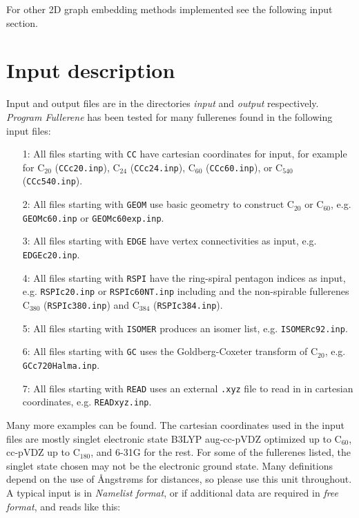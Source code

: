 \documentclass[article,a4paper,twoside]{memoir}
\newcommand{\C}[1]{\ensuremath{\mathrm{C}_{#1}}}
\newcommand{\filename}[1]{\texttt{#1}}
\begin{document}
For other 2D graph embedding methods implemented see the following input section.
       

\section{Input description}

Input and output files are in the directories \textit{input}  and   \textit{output}  respectively. \textit{Program Fullerene} has been tested 
for many fullerenes found in the following input files:\\
\begin{enumerate}
\item[1:] All files starting with \filename{CC} have cartesian coordinates for input, for example for
\C{20} (\filename{CCc20.inp}), \C{24} (\filename{CCc24.inp}), \C{60} (\filename{CCc60.inp}), or \C{540} (\filename{CCc540.inp}).
\item[2:] All files starting with \filename{GEOM} use basic geometry to construct \C{20} or \C{60}, e.g. \filename{GEOMc60.inp} or \filename{GEOMc60exp.inp}.
\item[3:] All files starting with \filename{EDGE} have vertex connectivities as input, e.g. \filename{EDGEc20.inp}.
\item[4:] All files starting with \filename{RSPI} have the ring-spiral pentagon indices as input, e.g. \filename{RSPIc20.inp} or \filename{RSPIc60NT.inp}
including and the non-spirable fullerenes \C{380} (\filename{RSPIc380.inp}) and \C{384} (\filename{RSPIc384.inp}).
\item[5:] All files starting with \filename{ISOMER} produces an isomer list, e.g. \filename{ISOMERc92.inp}.
\item[6:] All files starting with \filename{GC} uses the Goldberg-Coxeter transform of \C{20}, e.g. \filename{GCc720Halma.inp}.
\item[7:] All files starting with \filename{READ} uses an external \filename{.xyz} file to read in in cartesian coordinates, e.g. \filename{READxyz.inp}.
\end{enumerate}
Many more examples can be found. The cartesian coordinates used in the input files are mostly singlet electronic state 
B3LYP aug-cc-pVDZ optimized up to \C{60}, cc-pVDZ up to \C{180}, and 6-31G for the rest. 
For some of the fullerenes listed, the singlet state chosen may not be the electronic ground state.
Many definitions depend on the use of {\AA}ngstr{\o}ms for distances, so please use this unit throughout. 
A typical input is in \textit{Namelist format}, or if additional data are required in \textit{free format}, and reads like this:
\end{document}
